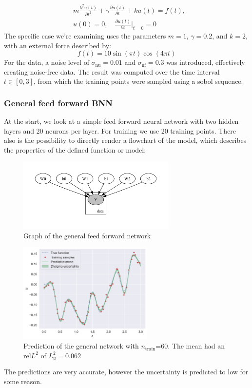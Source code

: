 \documentclass{article}
\newcommand{\nt}{$n_\text{train}$}
\begin{document}
\begin{align}
    & m\frac{\partial^2 u(t)}{\partial t^2} + \gamma \frac{\partial u(t)}{\partial t} + k u(t) = f(t), \\
    & u(0) = 0, \quad \frac{\partial u(t)}{\partial t}\bigg|_{t=0} = 0
\end{align}
The specific case we're examining uses the parameters \( m = 1 \), \( \gamma = 0.2 \), and \( k = 2 \), with an external force described by:
\begin{equation}
    f(t) = 10\sin(\pi t)\cos(4\pi t)
\end{equation}
For the data, a noise level of $\sigma_{\text{nu}} = 0.01$ and $\sigma_{\text{nf}} = 0.3$ was introduced, effectively creating noise-free data. The result was computed over the time interval \( t \in [0,3] \), from which the training points were sampled using a sobol sequence. 
\newpage
\subsubsection{General feed forward BNN}
At the start, we look at a simple feed forward neural network with two hidden layers and 20 neurons per layer. For training we use 20 training points. There also is the possibility to directly render a flowchart of the model, which describes the properties of the defined function or model:
\begin{figure}[htbp!]
    \centering
    \includegraphics[width=0.7\textwidth]{plots/bnn_oscilator1_pinn.pdf}
    \caption{Graph of the general feed forward network}
    \label{fig:training_samples}
\end{figure}
\begin{figure}[htbp!]
    \centering
    \includegraphics[width=0.6\textwidth]{plots/BNN/oscilator1_60_[20, 20, 1].png}
    \caption{Prediction of the general network with \nt=60. The mean had an rel$L^2$ of $L^2_u=0.062$}
    \label{fig:training_samples}
\end{figure}
The predictions are very accurate, however the uncertainty is predicted to low for some reason.
\end{document}
